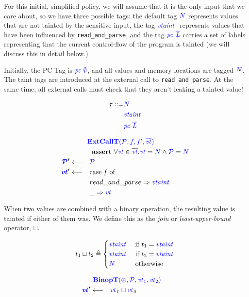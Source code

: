 \documentclass[acmsmall,review,anonymous]{acmart}\settopmatter{printfolios=true,printccs=false,printacmref=false}
\begin{document}
For this initial, simplified policy, we will assume that it is the only input that we care about,
so we have three possible tags: the default tag
\({\color{blue} N}\) represents values that are not tainted by the sensitive input, the tag
\(\mathit{\color{blue} vtaint ~ }\) represents values that have been influenced by {\tt read\_and\_parse}, and the tag
\(\mathit{\color{blue} pc ~ \overline{L}}\) carries a set of labels representing that
the current control-flow of the program is tainted (we will discuss this in detail
below.)

Initially, the PC Tag is \(\mathit{\color{blue} pc ~ \emptyset}\), and all values and memory locations are
tagged \({\color{blue} N}\). The taint tags are introduced at the external call to {\tt read\_and\_parse}.
At the same time, all external calls must check that they aren't leaking a tainted value!

\begin{minipage}{0.25\textwidth}
{ \color{blue}
  \begin{align*}
    \tau ::= & {\color{blue} N} \\
    & \mathit{\color{blue} vtaint ~ } \\
    & \mathit{\color{blue} pc ~ \overline{L}} \\
\end{align*} }
\end{minipage}
\begin{minipage}{0.74\textwidth}
\[\begin{aligned}
\truledef{\extcallt}
\assert{\forall \vt \in \overline{\vt} . \vt = \N \land \PCT = \N}
\settag{\PCT'}{\PCT}
\settag{\vt'}{\caseof{f}}
\caseentry{read\_and\_parse}{\vtaint{}} \\
\caseentry{\_}{\vt} \\
\end{aligned}\]
\end{minipage}

When two values are combined with a binary operation, the resulting value is tainted
if either of them was. We define this as the {\em join} or {\em least-upper-bound}
operator, \(\sqcup\).

\begin{minipage}[t]{.49\textwidth}
\[t_1 \sqcup t_2 \triangleq
\begin{cases}
  \mathit{\color{blue} vtaint ~ } & \textnormal{if } t_1 = \mathit{\color{blue} vtaint ~ } \\
  \mathit{\color{blue} vtaint ~ } & \textnormal{if } t_2 = \mathit{\color{blue} vtaint ~ } \\
  {\color{blue} N} & \textnormal{otherwise} \\
\end{cases}\]
\end{minipage}
\begin{minipage}[t]{.49\textwidth}
  \[\begin{aligned}
  \truledef{\binopt}
  \settag{\vt'}{
    \vt_1 \sqcup \vt_2
  }
  \end{aligned}\]
\end{minipage}
\end{document}
